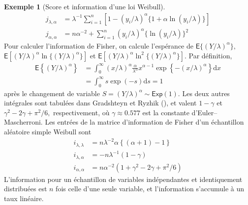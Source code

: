 \documentclass[
  11pt,
  letterpaper,
]{scrbook}
\theoremstyle{plain}
\theoremstyle{plain}
\theoremstyle{definition}
\newtheorem{example}{Exemple}[chapter]
\theoremstyle{definition}
\theoremstyle{remark}
\begin{document}
\begin{example}[Score et information d'une loi
Weibull]
\begin{align*}
j_{\lambda, \alpha} &= \lambda^{-1}\sum_{i=1}^n [1-(y_i/\lambda)^\alpha\{1+\alpha\ln(y_i/\lambda)\}] \\
j_{\alpha,\alpha} &= n\alpha^{-2} + \sum_{i=1}^n (y_i/\lambda)^\alpha \{\ln(y_i/\lambda)\}^2
\end{align*} Pour calculer l'information de Fisher, on calcule
l'espérance de \(\mathsf{E}\{(Y/\lambda)^\alpha\},\)
\(\mathsf{E}[(Y/\lambda)^\alpha\ln\{(Y/\lambda)^\alpha\}]\) et
\(\mathsf{E}[(Y/\lambda)^\alpha\ln^2\{(Y/\lambda)^\alpha\}].\) Par
définition, \begin{align*}
\mathsf{E}\left\{(Y/\lambda)^\alpha\right\} & = \int_0^\infty (x/\lambda)^\alpha \frac{\alpha}{\lambda^\alpha} x^{\alpha-1}\exp\left\{-(x/\lambda)^\alpha\right\} \mathrm{d} x \\
 &= \int_0^\infty s\exp(-s) \mathrm{d} s =1
\end{align*} après le changement de variable
\(S = (Y/\lambda)^\alpha\sim \mathsf{Exp}(1).\) Les deux autres
intégrales sont tabulées dans Gradshteyn et Ryzhik
(), et valent \(1-\gamma\) et
\(\gamma^2-2\gamma + \pi^2/6,\) respectivement, où
\(\gamma \approx 0.577\) est la constante d'Euler--Mascherroni. Les
entrées de la matrice d'information de Fisher d'un échantillon aléatoire
simple Weibull sont \begin{align*}
i_{\lambda, \lambda} & = n \lambda^{-2}\alpha\left\{ (\alpha+1)-1\right\} \\
i_{\lambda, \alpha} & = -n\lambda^{-1} (1-\gamma) \\
i_{\alpha, \alpha} & = n\alpha^{-2}(1 + \gamma^2-2\gamma+\pi^2/6) 
\end{align*} L'information pour un échantillon de variables
indépendantes et identiquement distribuées est \(n\) fois celle d'une
seule variable, et l'information s'accumule à un taux linéaire.

\end{example}
\end{document}
